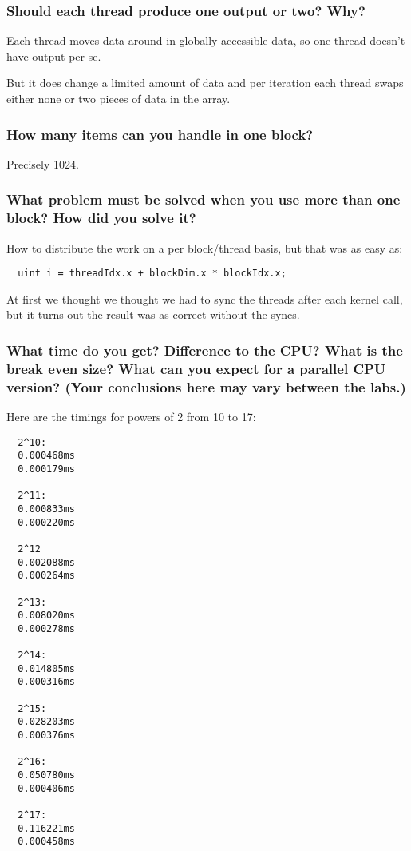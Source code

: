 \documentclass[a4paper,12pt]{article}
\begin{document}
\subsubsection{Should each thread produce one output or two? Why?}

Each thread moves data around in globally accessible data, so one thread doesn't have output per se.

But it does change a limited amount of data and per iteration each thread swaps either none or two pieces of data in the array.

\subsubsection{How many items can you handle in one block?}

Precisely 1024.

\subsubsection{What problem must be solved when you use more than one block? How did you solve it?}

How to distribute the work on a per block/thread basis, but that was as easy as:

\begin{lstlisting}
  uint i = threadIdx.x + blockDim.x * blockIdx.x;
\end{lstlisting}

At first we thought we thought we had to sync the threads after each kernel call, but it turns out the result was as correct without the syncs.


\subsubsection{What time do you get? Difference to the CPU? What is the break even size? What can you expect for a parallel CPU version? (Your conclusions here may vary between the labs.)}

Here are the timings for powers of 2 from 10 to 17:

\begin{lstlisting}
  2^10:
  0.000468ms
  0.000179ms

  2^11:
  0.000833ms
  0.000220ms

  2^12
  0.002088ms
  0.000264ms

  2^13:
  0.008020ms
  0.000278ms

  2^14:
  0.014805ms
  0.000316ms

  2^15:
  0.028203ms
  0.000376ms

  2^16:
  0.050780ms
  0.000406ms

  2^17:
  0.116221ms
  0.000458ms
\end{lstlisting}
\end{document}
